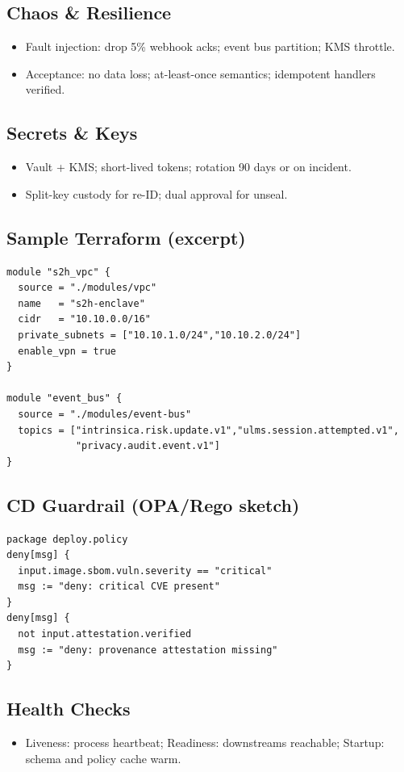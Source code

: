 \documentclass[11pt]{article}
\theoremstyle{plain}
\begin{document}
\subsection{Chaos \& Resilience}
\begin{itemize}
  \item Fault injection: drop 5\% webhook acks; event bus partition; KMS throttle.
  \item Acceptance: no data loss; at-least-once semantics; idempotent handlers verified.
\end{itemize}

\subsection{Secrets \& Keys}
\begin{itemize}
  \item Vault + KMS; short-lived tokens; rotation 90 days or on incident.
  \item Split-key custody for re-ID; dual approval for unseal.
\end{itemize}

\subsection{Sample Terraform (excerpt)}
\begin{verbatim}
module "s2h_vpc" {
  source = "./modules/vpc"
  name   = "s2h-enclave"
  cidr   = "10.10.0.0/16"
  private_subnets = ["10.10.1.0/24","10.10.2.0/24"]
  enable_vpn = true
}

module "event_bus" {
  source = "./modules/event-bus"
  topics = ["intrinsica.risk.update.v1","ulms.session.attempted.v1",
            "privacy.audit.event.v1"]
}
\end{verbatim}

\subsection{CD Guardrail (OPA/Rego sketch)}
\begin{verbatim}
package deploy.policy
deny[msg] {
  input.image.sbom.vuln.severity == "critical"
  msg := "deny: critical CVE present"
}
deny[msg] {
  not input.attestation.verified
  msg := "deny: provenance attestation missing"
}
\end{verbatim}

\subsection{Health Checks}
\begin{itemize}
  \item Liveness: process heartbeat; Readiness: downstreams reachable; Startup: schema and policy cache warm.
\end{itemize}
\end{document}
